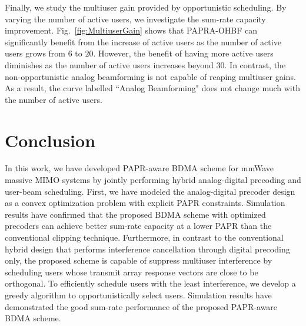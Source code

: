 \documentclass[conference]{IEEEtran}
\begin{document}
Finally, we study the multiuser gain provided by opportunistic scheduling. By varying the number of active users, we investigate the sum-rate capacity improvement. Fig.~\ref{fig:MultiuserGain} shows that PAPRA-OHBF can significantly benefit from the increase of active users as the number of active users grows from $6$ to $20$. However, the benefit of having more active users diminishes as the number of active users increases beyond $30$. In contrast, the non-opportunistic analog beamforming is not capable of reaping multiuser gains. As a result, the curve labelled ``Analog Beamforming" does not change much with the number of active users.	
	
\section{Conclusion}
In this work, we have developed PAPR-aware BDMA scheme for mmWave massive MIMO systems by jointly performing hybrid analog-digital precoding and user-beam scheduling. First, we have modeled the analog-digital precoder design as a convex optimization problem with explicit PAPR constraints. Simulation results have confirmed that the proposed BDMA scheme with optimized precoders can achieve better sum-rate capacity at a lower PAPR than the conventional clipping technique. Furthermore, in contrast to the conventional hybrid design that performs interference cancellation through digital precoding only, the proposed scheme is capable of suppress multiuser interference by scheduling users whose transmit array response vectors are close to be orthogonal. To efficiently schedule users with the least interference, we develop a greedy algorithm to opportunistically select users. Simulation results have demonstrated the good sum-rate performance of the proposed PAPR-aware BDMA scheme.



	
	
	
\end{document}
